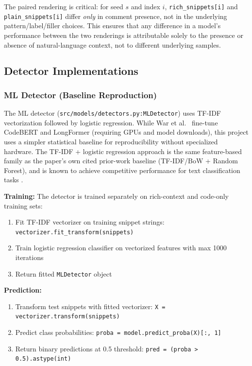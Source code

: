 The paired rendering is critical: for seed $s$ and index $i$, \texttt{rich\_snippets[i]} and \texttt{plain\_snippets[i]} differ \emph{only} in comment presence, not in the underlying pattern/label/filler choices. This ensures that any difference in a model's performance between the two renderings is attributable solely to the presence or absence of natural-language context, not to different underlying samples.

\subsection{Detector Implementations}

\subsubsection{ML Detector (Baseline Reproduction)}

The ML detector (\texttt{src/models/detectors.py:MLDetector}) uses TF-IDF vectorization followed by logistic regression. While War et al.~\cite{War25} fine-tune CodeBERT and LongFormer (requiring GPUs and model downloads), this project uses a simpler statistical baseline for reproducibility without specialized hardware. The TF-IDF + logistic regression approach is the same feature-based family as the paper's own cited prior-work baseline (TF-IDF/BoW + Random Forest), and is known to achieve competitive performance for text classification tasks \cite{Kovalenko23, Medeiros20}.

\textbf{Training:} The detector is trained separately on rich-context and code-only training sets:
\begin{enumerate}
  \item Fit TF-IDF vectorizer on training snippet strings: \texttt{vectorizer.fit\_transform(snippets)}
  \item Train logistic regression classifier on vectorized features with max 1000 iterations
  \item Return fitted \texttt{MLDetector} object
\end{enumerate}

\textbf{Prediction:}
\begin{enumerate}
  \item Transform test snippets with fitted vectorizer: \texttt{X = vectorizer.transform(snippets)}
  \item Predict class probabilities: \texttt{proba = model.predict\_proba(X)[:, 1]}
  \item Return binary predictions at 0.5 threshold: \texttt{pred = (proba > 0.5).astype(int)}
\end{enumerate}

